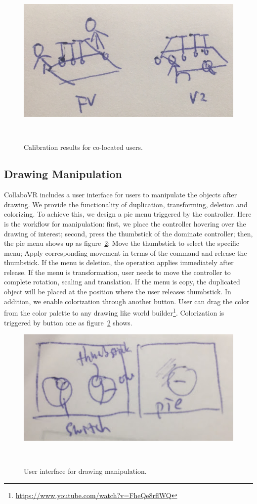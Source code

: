 \documentclass{sigchi}
\begin{document}
\begin{figure}[tb!]
 \centering
 \includegraphics[width=0.9\columnwidth]{vivepro.jpg}
 \caption{Calibration results for co-located users.
 }~\label{fig:vivepro}
\end{figure}

\subsection{Drawing Manipulation}
CollaboVR includes a user interface for users to manipulate the objects after drawing. We provide the functionality of duplication, transforming, deletion and colorizing. To achieve this, we design a pie menu triggered by the controller. Here is the workflow for manipulation: first, we place the controller hovering over the drawing of interest; second, press the thumbstick of the dominate controller; then, the pie menu shows up as figure~\ref{fig:userinterface}; Move the thumbstick to select the specific menu; Apply corresponding movement in terms of the command and release the thumbstick. If the menu is deletion, the operation applies immediately after release. If the menu is transformation, user needs to move the controller to complete rotation, scaling and translation. If the menu is copy, the duplicated object will be placed at the position where the user releases thumbstick. In addition, we enable colorization through another button. User can drag the color from the color palette to any drawing like world builder\footnote{\url{https://www.youtube.com/watch?v=FheQe8rflWQ}}. Colorization is triggered by button one as figure~\ref{fig:userinterface} shows. 

\begin{figure}[tb!]
 \centering
 \includegraphics[width=0.9\columnwidth]{userinterface.jpg}
 \caption{User interface for drawing manipulation.
 }~\label{fig:userinterface}
\end{figure}
\end{document}
